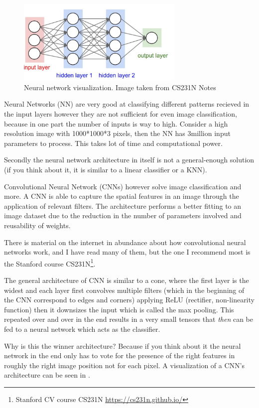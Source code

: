 \begin{figure}[!ht]
    \centering
    \includegraphics[width=80mm, keepaspectratio]{figures/nn.png}
    \caption{Neural network visualization. Image taken from CS231N Notes}
    \label{fig:convnet}
\end{figure}

Neural Networks (NN) are very good at classifying different patterns recieved in the
input layers however they are not sufficient for even image classification,
because in one part the number of inputs is way to high. Consider a high
resolution image with 1000*1000*3 pixels, then the NN has 3million input
parameters to process. This takes lot of time and computational power.

Secondly the neural network architecture in itself is not a
general-enough solution (if you think about it, it is similar to a linear
classifier or a KNN).

Convolutional Neural Network (CNNs) however solve image classification and more.
A CNN is able to capture the spatial features in an image through the
application of relevant filters. The architecture performs a better fitting to
an image dataset due to the reduction in the number of parameters involved and
reusability of weights.


There is material on the internet in abundance about how convolutional neural
networks work, and I have read many of them, but the one I recommend most is the
Stanford course CS231N\footnote{ Stanford CV course CS231N
\url{https://cs231n.github.io/}}. 

The general architecture of CNN is similar to a cone, where the first layer is
the widest and each layer first convolves multiple filters (which in the
beginning of the CNN correspond to edges and corners) applying ReLU (rectifier,
non-linearity function) then it downsizes the input which is called the max
pooling. This repeated over and over in the end results in a very small tensors
that \emph{then} can be fed to a neural network which acts as the classifier.

Why is this the winner architecture? Because if you think about it the neural
network in the end only has to vote for the presence of the right features in roughly
the right image position not for each pixel. A visualization of a
CNN's architecture can be seen in .

